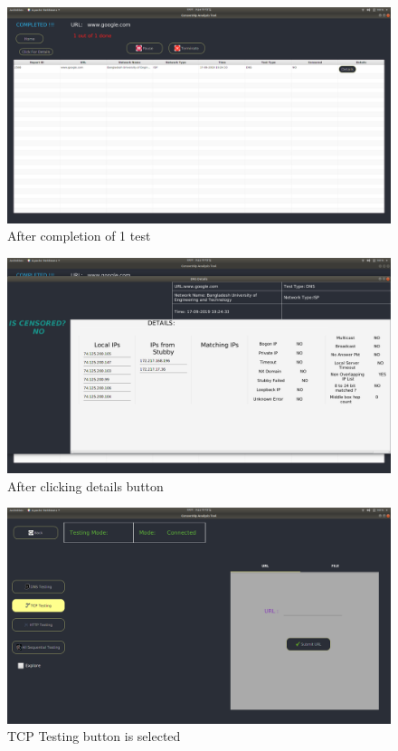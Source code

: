 \begin{figure}[h]
    \centering
    \includegraphics[width=\textwidth]{usersite/14completed.png}
    \caption{After completion of 1 test}
    \label{fig:user14}
\end{figure}

\begin{figure}[h]
    \centering
    \includegraphics[width=\textwidth]{usersite/15details.png}
    \caption{After clicking details button}
    \label{fig:user15}
\end{figure}

\begin{figure}[h]
    \centering
    \includegraphics[width=\textwidth]{usersite/17tcptest.png}
    \caption{TCP Testing button is selected}
    \label{fig:user16}
\end{figure}

